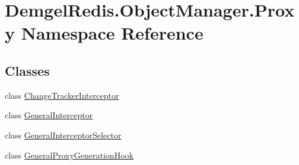 \hypertarget{namespace_demgel_redis_1_1_object_manager_1_1_proxy}{}\section{Demgel\+Redis.\+Object\+Manager.\+Proxy Namespace Reference}
\label{namespace_demgel_redis_1_1_object_manager_1_1_proxy}
\subsection*{Classes}
\begin{DoxyCompactItemize}
\item 
class \hyperlink{class_demgel_redis_1_1_object_manager_1_1_proxy_1_1_change_tracker_interceptor}{Change\+Tracker\+Interceptor}
\item 
class \hyperlink{class_demgel_redis_1_1_object_manager_1_1_proxy_1_1_general_interceptor}{General\+Interceptor}
\item 
class \hyperlink{class_demgel_redis_1_1_object_manager_1_1_proxy_1_1_general_interceptor_selector}{General\+Interceptor\+Selector}
\item 
class \hyperlink{class_demgel_redis_1_1_object_manager_1_1_proxy_1_1_general_proxy_generation_hook}{General\+Proxy\+Generation\+Hook}
\end{DoxyCompactItemize}
